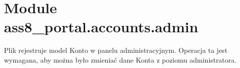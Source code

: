 %
%
%


\section{Module ass8\_portal.accounts.admin}

    \label{ass8_portal:accounts:admin}
Plik rejestruje model Konto w panelu administracyjnym. Operacja ta jest 
wymagana, aby można było zmieniać dane Konta z poziomu administratora.

